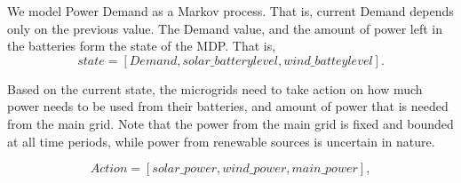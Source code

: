 \documentclass[conference]{IEEEtran}
\begin{document}
We model Power Demand as a Markov process. That is, current Demand depends only on the previous value. The Demand value, and the amount of power left in the batteries form the state of the MDP. That is, 
\begin{equation}
 state = [Demand, solar\_batterylevel, wind\_batteylevel].
\end{equation}

Based on the current state, the microgrids need to take action on how much power needs to be used from their batteries, and amount of power that is needed from the main grid. Note that the power from the main grid is fixed and bounded at all time periods, while power from renewable sources is uncertain in nature. 

\begin{equation}
Action = [solar\_power,wind\_power,main\_power],
\end{equation}
\end{document}
